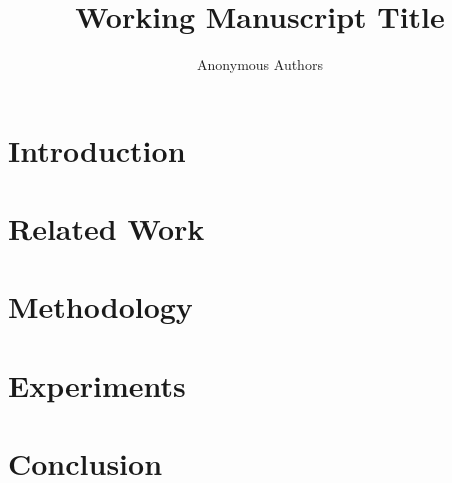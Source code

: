 \documentclass[11pt,a4paper]{article}
\title{Working Manuscript Title}
\author{Anonymous Authors}
\date{}
\begin{document}
\maketitle

\begin{abstract}
\end{abstract}

\section{Introduction}
\label{sec:intro}

\section{Related Work}
\label{sec:related}

\section{Methodology}
\label{sec:method}

\section{Experiments}
\label{sec:experiments}

\section{Conclusion}
\label{sec:conclusion}



\end{document}
